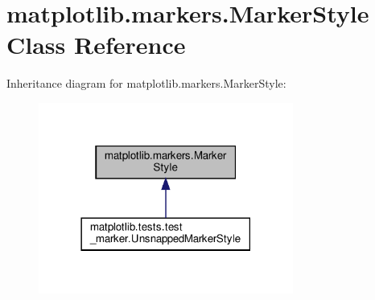 \hypertarget{classmatplotlib_1_1markers_1_1MarkerStyle}{}\section{matplotlib.\+markers.\+Marker\+Style Class Reference}
\label{classmatplotlib_1_1markers_1_1MarkerStyle}


Inheritance diagram for matplotlib.\+markers.\+Marker\+Style\+:
\nopagebreak
\begin{figure}[H]
\begin{center}
\leavevmode
\includegraphics[width=237pt]{classmatplotlib_1_1markers_1_1MarkerStyle__inherit__graph}
\end{center}
\end{figure}
